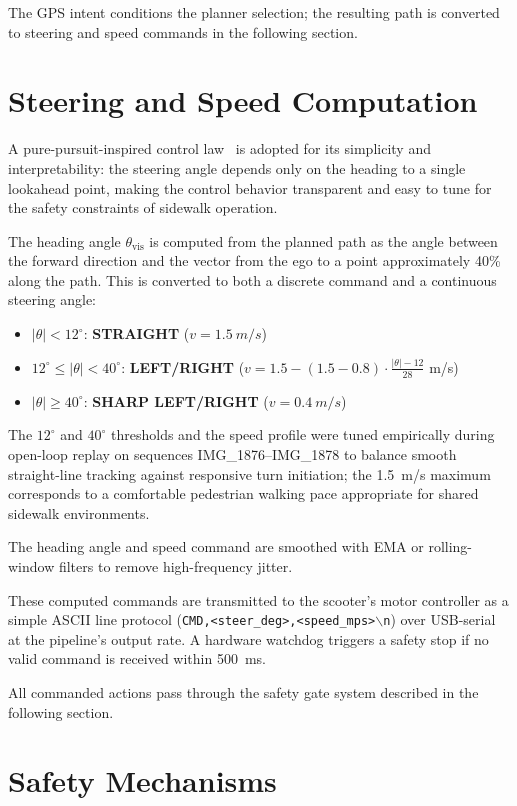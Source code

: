 \documentclass[12pt,letterpaper,oneside]{report}
\begin{document}
The GPS intent conditions the planner selection; the resulting path is converted to steering and speed commands in the following section.


\section{Steering and Speed Computation}
\label{sec:steer_speed}

A pure-pursuit-inspired control law~\cite{coulter1992pure} is adopted for its simplicity and interpretability: the steering angle depends only on the heading to a single lookahead point, making the control behavior transparent and easy to tune for the safety constraints of sidewalk operation.

The heading angle $\theta_\text{vis}$ is computed from the planned path as the angle between the forward direction and the vector from the ego to a point approximately 40\% along the path. This is converted to both a discrete command and a continuous steering angle:
\begin{itemize}[nosep]
  \item $|\theta| < 12^\circ$: \textbf{STRAIGHT} ($v = \SI{1.5}{m/s}$)
  \item $12^\circ \le |\theta| < 40^\circ$: \textbf{LEFT/RIGHT} ($v = 1.5 - (1.5 - 0.8) \cdot \frac{|\theta|-12}{28}$ m/s)
  \item $|\theta| \ge 40^\circ$: \textbf{SHARP LEFT/RIGHT} ($v = \SI{0.4}{m/s}$)
\end{itemize}
The $12^\circ$ and $40^\circ$ thresholds and the speed profile were tuned empirically during open-loop replay on sequences IMG\_1876--IMG\_1878 to balance smooth straight-line tracking against responsive turn initiation; the 1.5~m/s maximum corresponds to a comfortable pedestrian walking pace appropriate for shared sidewalk environments.

The heading angle and speed command are smoothed with EMA or rolling-window filters to remove high-frequency jitter.

These computed commands are transmitted to the scooter's motor controller as a simple ASCII line protocol (\texttt{CMD,<steer\_deg>,<speed\_mps>$\backslash$n}) over USB-serial at the pipeline's output rate.  A hardware watchdog triggers a safety stop if no valid command is received within \SI{500}{ms}.

All commanded actions pass through the safety gate system described in the following section.


\section{Safety Mechanisms}
\label{sec:safety}
\end{document}
